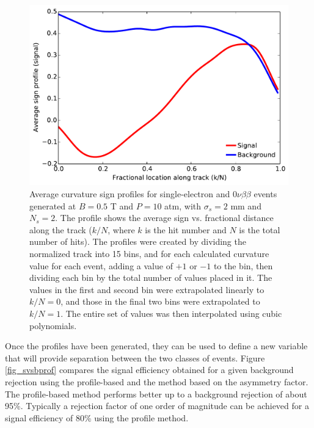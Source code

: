 \begin{figure}[!htb]
	\centering
	\includegraphics[scale=0.55]{img2/sbprof_nmagse2.pdf}
	\caption{\label{fig_profiles}Average curvature sign profiles for single-electron and $0\nu\beta\beta$ events generated at $B = 0.5$ T and $P = 10$ atm, with $\sigma_{s} = 2$ mm and $N_{s} = 2$.  The profile shows the average sign vs. fractional distance along the track ($k/N$, where $k$ is the hit number and $N$ is the total number of hits).  The profiles were created by dividing the normalized track into 15 bins, and for each calculated curvature value for each event, adding a value of $+1$ or $-1$ to the bin, then dividing each bin by the total number of values placed in it.  The values in the first and second bin were extrapolated linearly to $k/N = 0$, and those in the final two bins were extrapolated to $k/N = 1$.  The entire set of values was then interpolated using cubic polynomials.}
\end{figure}

Once the profiles have been generated, they can be used to define a new variable that will provide separation between the two classes of events.  Figure \ref{fig_svsbprof} compares the signal efficiency obtained for a given background rejection using the profile-based and the method based on the asymmetry factor.  The profile-based method performs better up to a background rejection of about 95\%. Typically a rejection factor of one order of magnitude can be achieved for a signal efficiency of 80\% using the profile method. 

